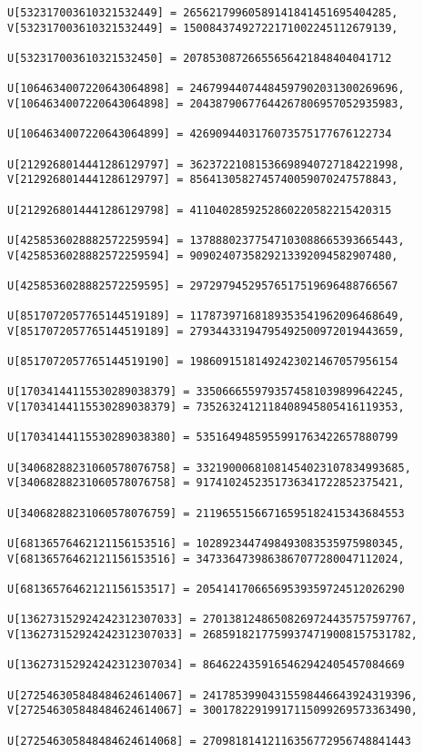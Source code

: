 \documentclass[a4paper]{article}
\begin{document}
\begin{verbatim}
U[532317003610321532449] = 26562179960589141841451695404285, 
V[532317003610321532449] = 15008437492722171002245112679139, 

U[532317003610321532450] = 20785308726655656421848404041712

U[1064634007220643064898] = 24679944074484597902031300269696, 
V[1064634007220643064898] = 20438790677644267806957052935983, 

U[1064634007220643064899] = 4269094403176073575177676122734

U[2129268014441286129797] = 36237221081536698940727184221998, 
V[2129268014441286129797] = 8564130582745740059070247578843, 

U[2129268014441286129798] = 4110402859252860220582215420315

U[4258536028882572259594] = 13788802377547103088665393665443, 
V[4258536028882572259594] = 9090240735829213392094582907480, 

U[4258536028882572259595] = 29729794529576517519696488766567

U[8517072057765144519189] = 11787397168189353541962096468649, 
V[8517072057765144519189] = 27934433194795492500972019443659, 

U[8517072057765144519190] = 19860915181492423021467057956154

U[17034144115530289038379] = 3350666559793574581039899642245, 
V[17034144115530289038379] = 7352632412118408945805416119353, 

U[17034144115530289038380] = 5351649485955991763422657880799

U[34068288231060578076758] = 33219000681081454023107834993685, 
V[34068288231060578076758] = 9174102452351736341722852375421, 

U[34068288231060578076759] = 21196551566716595182415343684553

U[68136576462121156153516] = 1028923447498493083535975980345, 
V[68136576462121156153516] = 3473364739863867077280047112024, 

U[68136576462121156153517] = 20541417066569539359724512026290

U[136273152924242312307033] = 27013812486508269724435757597767, 
V[136273152924242312307033] = 26859182177599374719008157531782, 

U[136273152924242312307034] = 8646224359165462942405457084669

U[272546305848484624614067] = 24178539904315598446643924319396, 
V[272546305848484624614067] = 30017822919917115099269573363490, 

U[272546305848484624614068] = 27098181412116356772956748841443


\end{verbatim}
\end{document}
